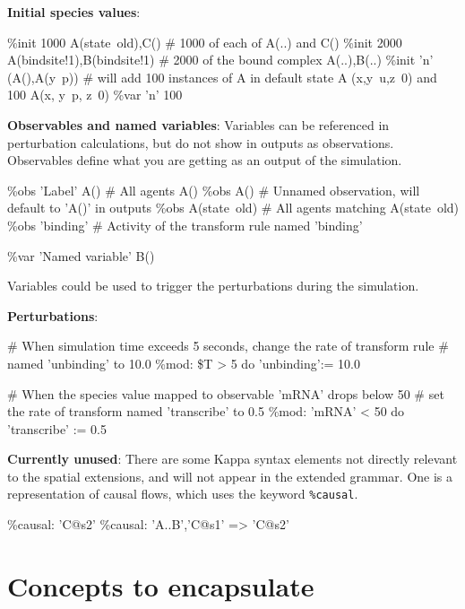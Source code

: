 \textbf{Initial species values}:

\begin{kappasource}
\%init 1000 A(state~old),C()            # 1000 of each of A(..) and C()
\%init 2000 A(bindsite!1),B(bindsite!1) # 2000 of the bound complex A(..),B(..)
\%init 'n' (A(),A(y~p)) # will add 100 instances of A in default state A (x,y~u,z~0) and 100 A(x, y~p, z~0)
\%var 'n' 100

\end{kappasource} 

\textbf{Observables and named variables}: Variables can be referenced in perturbation calculations, but do not show in outputs as observations. Observables define what you are getting as an output of the simulation.

\begin{kappasource}
\%obs 'Label' A()  # All agents A()
\%obs A()          # Unnamed observation, will default to 'A()' in outputs
\%obs A(state~old) # All agents matching A(state~old)
\%obs 'binding'    # Activity of the transform rule named 'binding'

\%var 'Named variable' B()
\end{kappasource} 

Variables could be used to trigger the perturbations during the simulation.

\textbf{Perturbations}: 

\begin{kappasource}
# When simulation time exceeds 5 seconds, change the rate of transform rule
#   named 'unbinding' to 10.0
\%mod: \$T > 5 do ’unbinding’:= 10.0

# When the species value mapped to observable 'mRNA' drops below 50
#   set the rate of transform named 'transcribe' to 0.5
\%mod: 'mRNA' < 50 do 'transcribe' := 0.5
\end{kappasource} 

\textbf{Currently unused}: There are some Kappa syntax elements not directly relevant to the spatial extensions, and will not appear in the extended grammar. One is a representation of causal flows, which uses the keyword \verb|%causal|.

\begin{kappasource}
\%causal: ’C@s2’ 
\%causal: {’A..B’,’C@s1’} => ’C@s2’ 
\end{kappasource} 

\section{Concepts to encapsulate}

